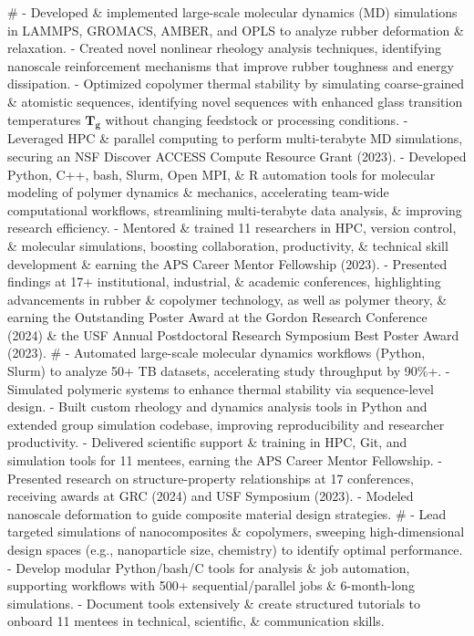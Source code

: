 #
- Developed \& implemented large-scale molecular dynamics (MD) simulations in LAMMPS, GROMACS, AMBER, and OPLS to analyze rubber deformation \& relaxation.
- Created novel nonlinear rheology analysis techniques, identifying nanoscale reinforcement mechanisms that improve rubber toughness and energy dissipation.
- Optimized copolymer thermal stability by simulating coarse-grained \& atomistic sequences, identifying novel sequences with enhanced glass transition temperatures $\bm{T_{g}}$ without changing feedstock or processing conditions.
- Leveraged HPC \& parallel computing to perform multi-terabyte MD simulations, securing an NSF Discover ACCESS Compute Resource Grant (2023).
- Developed Python, C++, bash, Slurm, Open MPI, \& R automation tools for molecular modeling of polymer dynamics \& mechanics, accelerating team-wide computational workflows, streamlining multi-terabyte data analysis, \& improving research efficiency.
- Mentored \& trained 11 researchers in HPC, version control, \& molecular simulations, boosting collaboration, productivity, \& technical skill development \& earning the APS Career Mentor Fellowship (2023).
- Presented findings at 17+ institutional, industrial, \& academic conferences, highlighting advancements in rubber \& copolymer technology, as well as polymer theory, \& earning the Outstanding Poster Award at the Gordon Research Conference (2024) \& the USF Annual Postdoctoral Research Symposium Best Poster Award (2023).
#
- Automated large-scale molecular dynamics workflows (Python, Slurm) to analyze 50+ TB datasets, accelerating study throughput by 90\%+.
- Simulated polymeric systems to enhance thermal stability via sequence-level design.
- Built custom rheology and dynamics analysis tools in Python and extended group simulation codebase, improving reproducibility and researcher productivity.
- Delivered scientific support \& training in HPC, Git, and simulation tools for 11 mentees, earning the APS Career Mentor Fellowship.
- Presented research on structure-property relationships at 17 conferences, receiving awards at GRC (2024) and USF Symposium (2023).
- Modeled nanoscale deformation to guide composite material design strategies.
#
- Lead targeted simulations of nanocomposites \& copolymers, sweeping high-dimensional design spaces (e.g., nanoparticle size, chemistry) to identify optimal performance.
- Develop modular Python/bash/C tools for analysis \& job automation, supporting workflows with 500+ sequential/parallel jobs \& 6-month-long simulations.
- Document tools extensively \& create structured tutorials to onboard 11 mentees in technical, scientific, \& communication skills.
